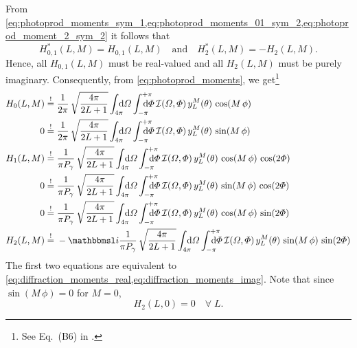 From
\cref{eq:photoprod_moments_sym_1,eq:photoprod_moments_01_sym_2,eq:photoprod_moment_2_sym_2}
it follows that
\begin{equation}
  \label{eq:photoprodP_moments_real_imag}
  H_{0, 1}^*(L, M)
  = H_{0, 1}(L, M)
  \quad\text{and}\quad
  H_2^*(L, M)
  = -H_2(L, M).
\end{equation}
Hence, all $H_{0, 1}(L, M)$ must be real-valued and all $H_2(L, M)$
must be purely imaginary.  Consequently, from
\cref{eq:photoprod_moments}, we get\footnote{See Eq.~(B6) in
.}
\begin{align}
  \label{eq:photoprod_moment_0_real}
  H_0(L, M)
  \mustBeEq{}& \frac{1}{2 \pi}\, \sqrt{\frac{4 \pi}{2 L + 1}} \int_{4 \pi}\!\!\!\! \dif{\Omega} \int_{-\pi}^{+\pi}\hspace{-1.2em} \dif{\Phi}\,
  \intensity(\Omega, \Phi)\, y_L^M(\theta)\, \cos(M\, \phi)
  \\
  \label{eq:photoprod_moment_0_imag}
  0
  \mustBeEq{}& \frac{1}{2 \pi}\, \sqrt{\frac{4 \pi}{2 L + 1}} \int_{4 \pi}\!\!\!\! \dif{\Omega} \int_{-\pi}^{+\pi}\hspace{-1.2em} \dif{\Phi}\,
  \intensity(\Omega, \Phi)\, y_L^M(\theta)\, \sin(M\, \phi)
  \\
  \label{eq:photoprod_moment_1_real}
  H_1(L, M)
  \mustBeEq{}& \frac{1}{\pi P_\gamma}\, \sqrt{\frac{4 \pi}{2 L + 1}} \int_{4 \pi}\!\!\!\! \dif{\Omega} \int_{-\pi}^{+\pi}\hspace{-1.2em} \dif{\Phi}\,
  \intensity(\Omega, \Phi)\, y_L^M(\theta)\, \cos(M\, \phi)\, \cos(2 \Phi)
  \\
  \label{eq:photoprod_moment_1_imag}
  0
  \mustBeEq{}& \frac{1}{\pi P_\gamma}\, \sqrt{\frac{4 \pi}{2 L + 1}} \int_{4 \pi}\!\!\!\! \dif{\Omega} \int_{-\pi}^{+\pi}\hspace{-1.2em} \dif{\Phi}\,
  \intensity(\Omega, \Phi)\, y_L^M(\theta)\, \sin(M\, \phi)\, \cos(2 \Phi)
  \\
  \label{eq:photoprod_moment_2_real}
  0
  \mustBeEq{}& \frac{1}{\pi P_\gamma}\, \sqrt{\frac{4 \pi}{2 L + 1}} \int_{4 \pi}\!\!\!\! \dif{\Omega} \int_{-\pi}^{+\pi}\hspace{-1.2em} \dif{\Phi}\,
  \intensity(\Omega, \Phi)\, y_L^M(\theta)\, \cos(M\, \phi)\, \sin(2 \Phi)
  \\
  \label{eq:photoprod_moment_2_imag}
  H_2(L, M)
  \mustBeEq{}& -\imag \frac{1}{\pi P_\gamma}\, \sqrt{\frac{4 \pi}{2 L + 1}} \int_{4 \pi}\!\!\!\! \dif{\Omega} \int_{-\pi}^{+\pi}\hspace{-1.2em} \dif{\Phi}\,
  \intensity(\Omega, \Phi)\, y_L^M(\theta)\, \sin(M\, \phi)\, \sin(2 \Phi)
\end{align}
The first two equations are equivalent to
\cref{eq:diffraction_moments_real,eq:diffraction_moments_imag}.  Note
that since $\sin(M\, \phi) = 0$ for $M = 0$,
\begin{equation}
  \label{eq:photoprod_moment_2_M0}
  H_2(L, 0) = 0
  \quad\forall\; L.
\end{equation}

